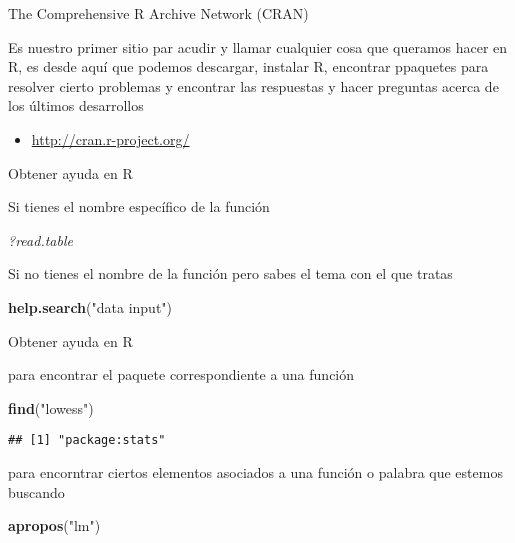 \documentclass[ignorenonframetext,]{beamer}
\newenvironment{Shaded}{\begin{snugshade}}{\end{snugshade}}
\newcommand{\KeywordTok}[1]{\textcolor[rgb]{0.13,0.29,0.53}{\textbf{#1}}}
\newcommand{\StringTok}[1]{\textcolor[rgb]{0.31,0.60,0.02}{#1}}
\newcommand{\CommentTok}[1]{\textcolor[rgb]{0.56,0.35,0.01}{\textit{#1}}}
\newcommand{\NormalTok}[1]{#1}
\providecommand{\tightlist}{%
  \setlength{\itemsep}{0pt}\setlength{\parskip}{0pt}}
\begin{document}
\begin{frame}{The Comprehensive R Archive Network (CRAN)}

Es nuestro primer sitio par acudir y llamar cualquier cosa que queramos
hacer en R, es desde aquí que podemos descargar, instalar R, encontrar
ppaquetes para resolver cierto problemas y encontrar las respuestas y
hacer preguntas acerca de los últimos desarrollos

\begin{itemize}
\tightlist
\item
  \url{http://cran.r-project.org/}
\end{itemize}

\end{frame}

\begin{frame}[fragile]{Obtener ayuda en R}

Si tienes el nombre específico de la función

\begin{Shaded}
\begin{Highlighting}[]
\CommentTok{?read.table}
\end{Highlighting}
\end{Shaded}

Si no tienes el nombre de la función pero sabes el tema con el que
tratas

\begin{Shaded}
\begin{Highlighting}[]
\KeywordTok{help.search}\NormalTok{(}\StringTok{"data input"}\NormalTok{)}
\end{Highlighting}
\end{Shaded}

\end{frame}

\begin{frame}[fragile]{Obtener ayuda en R}

para encontrar el paquete correspondiente a una función

\begin{Shaded}
\begin{Highlighting}[]
\KeywordTok{find}\NormalTok{(}\StringTok{"lowess"}\NormalTok{)}
\end{Highlighting}
\end{Shaded}

\begin{verbatim}
## [1] "package:stats"
\end{verbatim}

para encorntrar ciertos elementos asociados a una función o palabra que
estemos buscando

\begin{Shaded}
\begin{Highlighting}[]
\KeywordTok{apropos}\NormalTok{(}\StringTok{"lm"}\NormalTok{)}
\end{Highlighting}
\end{Shaded}

\end{frame}
\end{document}
